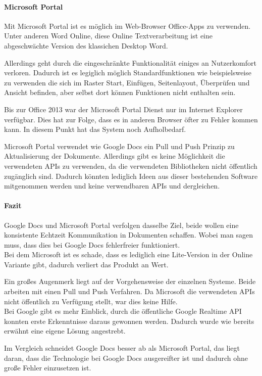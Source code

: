 \paragraph{Microsoft Portal}
Mit Microsoft Portal ist es möglich im Web-Browser Office-Apps zu verwenden. Unter anderen Word Online, diese Online Textverarbeitung ist eine abgeschwächte Version des klassichen Desktop Word.

Allerdings geht durch die eingeschränkte Funktionalität einiges an Nutzerkomfort verloren. Dadurch ist es legiglich möglich Standardfunktionen wie beispielsweise zu verwenden die sich im Raster Start, Einfügen, Seitenlayout, Überprüfen und Ansicht befinden, aber selbst dort können Funktionen nicht enthalten sein.

Bis zur Office 2013 war der Microsoft Portal Dienst nur im Internet Explorer verfügbar. Dies hat zur Folge, dass es in anderen Browser öfter zu Fehler kommen kann. In diesem Punkt hat das System noch Aufholbedarf.

Microsoft Portal verwendet wie Google Docs ein Pull und Push Prinzip zu Aktualisierung der Dokumente. Allerdings gibt es keine Möglichkeit die verwendeten APIs zu verwenden, da die verwendeten Bibliotheken nicht öffentlich zugänglich sind. Dadurch könnten lediglich Ideen aus dieser bestehenden Software mitgenommen werden und keine verwendbaren APIs und dergleichen.

\paragraph{Fazit}
Google Docs und Microsoft Portal verfolgen dasselbe Ziel, beide wollen eine konsistente Echtzeit Kommunikation in Dokumenten schaffen. Wobei man sagen muss, dass dies bei Google Docs fehlerfreier funktioniert.\\
Bei dem Microsoft ist es schade, dass es lediglich eine Lite-Version in der Online Variante gibt, dadurch verliert das Produkt an Wert.

Ein großes Augenmerk liegt auf der Vorgehensweise der einzelnen Systeme. Beide arbeiten mit einen Pull und Push Verfahren. Da Microsoft die verwendeten APIs nicht öffentlich zu Verfügung stellt, war dies keine Hilfe.\\
Bei Google gibt es mehr Einblick, durch die öffentliche Google Realtime API konnten erste Erkenntnisse daraus gewonnen werden. Dadurch wurde wie bereits erwähnt eine eigene Lösung angestrebt.

Im Vergleich schneidet Google Docs besser ab als Microsoft Portal, das liegt daran, dass die Technologie bei Google Docs ausgereifter ist und dadurch ohne große Fehler einzusetzen ist.
\newpage

